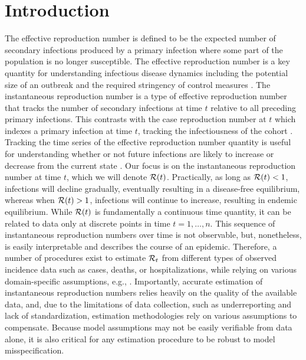 \section{Introduction}
\label{sec:intro}

The effective reproduction number is defined to be the expected number of
secondary infections produced by a primary infection where some part of the
population is no longer susceptible. The effective reproduction number is a key
quantity for understanding infectious disease dynamics including the potential
size of an outbreak and the required stringency of control measures
\citep{nishiura2009effective,fraser2007estimating}. The instantaneous
reproduction number is a type of effective reproduction number that tracks the
number of secondary infections at time $t$ relative to all preceding primary
infections. This contrasts with the case reproduction number at $t$ which
indexes a primary infection at time $t$, tracking the infectiousness of the
cohort \citep{gostic2020practical}. Tracking the time series of the effective
reproduction number quantity is useful for understanding whether or not future
infections are likely to increase or decrease from the current state
\citep{anderson1991infectious}. Our focus is on the instantaneous reproduction
number at time $t$, which we will denote $\mathcal{R}(t)$. Practically, as long as
$\mathcal{R}(t) < 1$, infections will decline gradually, eventually resulting in a
disease-free equilibrium, whereas when $\mathcal{R}(t) > 1$, infections will continue
to increase, resulting in endemic equilibrium. While $\mathcal{R}(t)$ is fundamentally
a continuous time quantity, it can be related to data only at discrete points in
time $t = 1,\ldots,n$. This sequence of instantaneous reproduction numbers over
time is not observable, but, nonetheless, is easily interpretable and describes
the course of an epidemic. Therefore, a number of procedures exist to estimate
$\mathcal{R}_t$ from different types of observed incidence data such as cases, deaths,
or hospitalizations, while relying on various domain-specific assumptions, e.g.,
\cite{wallinga2004different,hao2020reconstruction,goldstein2023semiparametric,goldstein2024incorporating}.
Importantly, accurate estimation of instantaneous reproduction numbers relies
heavily on the quality of the available data, and, due to the limitations of
data collection, such as underreporting and lack of standardization, estimation
methodologies rely on various assumptions to compensate. Because model
assumptions may not be easily verifiable from data alone, it is also critical
for any estimation procedure to be robust to model misspecification. 


